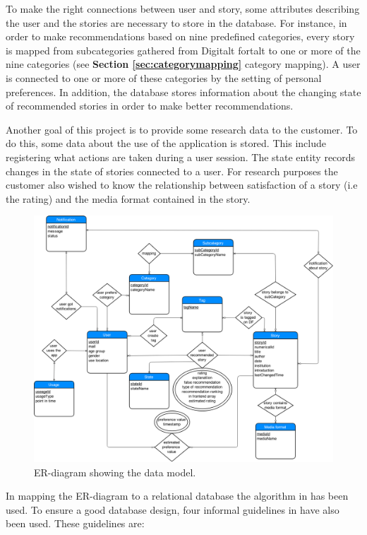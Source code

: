 To make the right connections between user and story, some attributes describing the user and the stories are necessary to store in the database. For instance, in order to make recommendations based on nine predefined categories, every story is mapped from subcategories gathered from Digitalt fortalt to one or more of the nine categories (see \textbf{Section \ref{sec:categorymapping}} category mapping). A user is connected to one or more of these categories by the setting of personal preferences. In addition, the database stores information about the changing state of recommended stories in order to make better recommendations. \newline

Another goal of this project is to provide some research data to the customer. To do this, some data about the use of the application is stored. This include registering what actions are taken during a user session. The state entity records changes in the state of stories connected to a user. For research purposes the customer also wished to know the relationship between satisfaction of a story (i.e the rating) and the media format contained in the story.

\begin{figure}[h!]
	\centering
	\includegraphics[width=\textwidth]{fig/er_diagram}
	\caption{ER-diagram showing the data model.}
	\label{Fig:er_diagram}
\end{figure}

In mapping the ER-diagram to a relational database the algorithm in \cite[p.270-278]{AS2} has been used. To ensure a good database design, four informal guidelines in \cite[p.487-497]{AS2} have also been used. These guidelines are:

